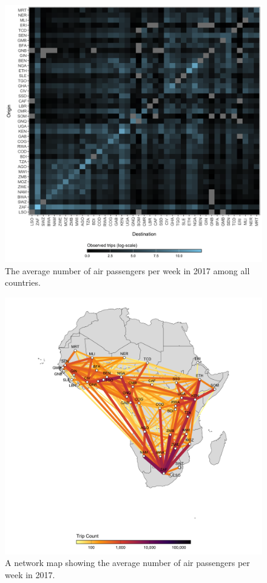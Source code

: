 \documentclass[
]{book}
\begin{document}
\begin{figure}

{\centering \includegraphics[width=1\linewidth]{figures/mobility_flight_data} 

}

\caption{The average number of air passengers per week in 2017 among all countries.}\label{fig:mobility-data}
\end{figure}
\begin{figure}

{\centering \includegraphics[width=1\linewidth]{figures/mobility_network} 

}

\caption{A network map showing the average number of air passengers per week in 2017.}\label{fig:mobility-network}
\end{figure}
\end{document}
